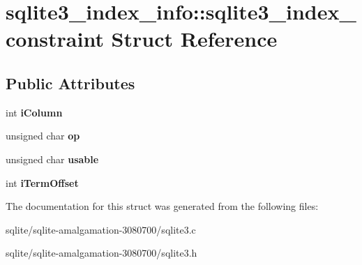\hypertarget{structsqlite3__index__info_1_1sqlite3__index__constraint}{\section{sqlite3\+\_\+index\+\_\+info\+:\+:sqlite3\+\_\+index\+\_\+constraint Struct Reference}
\label{structsqlite3__index__info_1_1sqlite3__index__constraint}
}
\subsection*{Public Attributes}
\begin{DoxyCompactItemize}
\item 
\hypertarget{structsqlite3__index__info_1_1sqlite3__index__constraint_a0f1e207060420058ee2881f2ea368e3a}{int {\bfseries i\+Column}}\label{structsqlite3__index__info_1_1sqlite3__index__constraint_a0f1e207060420058ee2881f2ea368e3a}

\item 
\hypertarget{structsqlite3__index__info_1_1sqlite3__index__constraint_a362f4ec1f71975cb0ac39a8b5e4b1476}{unsigned char {\bfseries op}}\label{structsqlite3__index__info_1_1sqlite3__index__constraint_a362f4ec1f71975cb0ac39a8b5e4b1476}

\item 
\hypertarget{structsqlite3__index__info_1_1sqlite3__index__constraint_ae16e62caeab743cc68bb22227dacb501}{unsigned char {\bfseries usable}}\label{structsqlite3__index__info_1_1sqlite3__index__constraint_ae16e62caeab743cc68bb22227dacb501}

\item 
\hypertarget{structsqlite3__index__info_1_1sqlite3__index__constraint_a4e8368da66f34b7f07b369984b813d1b}{int {\bfseries i\+Term\+Offset}}\label{structsqlite3__index__info_1_1sqlite3__index__constraint_a4e8368da66f34b7f07b369984b813d1b}

\end{DoxyCompactItemize}


The documentation for this struct was generated from the following files\+:\begin{DoxyCompactItemize}
\item 
sqlite/sqlite-\/amalgamation-\/3080700/sqlite3.\+c\item 
sqlite/sqlite-\/amalgamation-\/3080700/sqlite3.\+h\end{DoxyCompactItemize}
